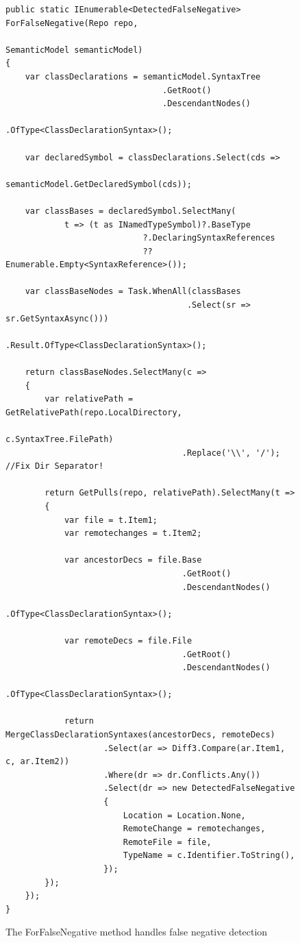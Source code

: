 \documentclass[draftclsnofoot,onecolumn]{IEEEtran}
\begin{document}
\begin{figure}[!t]
\centering
\begin{lstlisting}
public static IEnumerable<DetectedFalseNegative> ForFalseNegative(Repo repo,
                                                   SemanticModel semanticModel)
{
    var classDeclarations = semanticModel.SyntaxTree
                                .GetRoot()
                                .DescendantNodes()
                                .OfType<ClassDeclarationSyntax>();

    var declaredSymbol = classDeclarations.Select(cds => 
	                                     semanticModel.GetDeclaredSymbol(cds));

    var classBases = declaredSymbol.SelectMany(
            t => (t as INamedTypeSymbol)?.BaseType
                            ?.DeclaringSyntaxReferences 
							?? Enumerable.Empty<SyntaxReference>());

    var classBaseNodes = Task.WhenAll(classBases
	                                 .Select(sr => sr.GetSyntaxAsync()))
                           .Result.OfType<ClassDeclarationSyntax>();

    return classBaseNodes.SelectMany(c =>
    {
        var relativePath = GetRelativePath(repo.LocalDirectory, 
		                                                 c.SyntaxTree.FilePath)
                                    .Replace('\\', '/'); //Fix Dir Separator!

        return GetPulls(repo, relativePath).SelectMany(t =>
        {
            var file = t.Item1;
            var remotechanges = t.Item2;

            var ancestorDecs = file.Base
                                    .GetRoot()
                                    .DescendantNodes()
                                    .OfType<ClassDeclarationSyntax>();

            var remoteDecs = file.File
                                    .GetRoot()
                                    .DescendantNodes()
                                    .OfType<ClassDeclarationSyntax>();

            return MergeClassDeclarationSyntaxes(ancestorDecs, remoteDecs)
                    .Select(ar => Diff3.Compare(ar.Item1, c, ar.Item2))
                    .Where(dr => dr.Conflicts.Any())
                    .Select(dr => new DetectedFalseNegative
                    {
                        Location = Location.None,
                        RemoteChange = remotechanges,
                        RemoteFile = file,
                        TypeName = c.Identifier.ToString(),
                    });
        });
    });
}
\end{lstlisting}
\caption{The ForFalseNegative method handles false negative detection}
\label{anforfn}
\end{figure}
\end{document}
